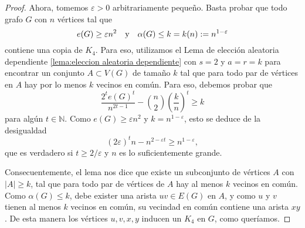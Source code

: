\documentclass[12pt]{report}
\theoremstyle{plain}
\theoremstyle{definition}
\newcommand{\naturals}{\mathbb{N}}
\newcommand{\abs}[1]{\left \vert #1 \right \vert}
\begin{document}
\begin{proof}
Ahora, tomemos $\varepsilon > 0$ arbitrariamente pequeño. Basta probar que todo grafo $G$ con $n$ vértices tal que
\[
    e(G) \geq \varepsilon n^2 \quad \text y \quad \alpha (G) \leq k = k(n) := n^{1- \varepsilon}
\]
contiene una copia de $K_4$. Para eso, utilizamos el Lema de elección aleatoria dependiente \ref{lema:eleccion aleatoria dependiente} con $s = 2$ y $a = r = k$ para encontrar un conjunto $A \subset V(G)$ de tamaño $k$ tal que para todo par de vértices en $A$ hay por lo menos $k$ vecinos en común. Para eso, debemos probar que
\[
    \frac{2^t e(G)^t}{n^{2t-1}} - \binom n 2 \left ( \frac k n \right )^t \geq k
\]
para algún $t \in \naturals$. Como $e(G) \geq \varepsilon n^2$ y $k = n^{1-\varepsilon}$, esto se deduce de la desigualdad
\[
    (2\varepsilon)^t n - n^{2 - \varepsilon t} \geq n^{1-\varepsilon},
\]
que es verdadero si $t \geq 2 / \varepsilon$ y $n$ es lo suficientemente grande.

Consecuentemente, el lema nos dice que existe un subconjunto de vértices $A$ con $\abs A \geq k$, tal que para todo par de vértices de $A$ hay al menos $k$ vecinos en común. Como $\alpha (G) \leq k$, debe exister una arista $uv \in E(G)$ en $A$, y como $u$ y $v$ tienen al menos $k$ vecinos en común, su vecindad en común contiene una arista $xy$. De esta manera los vértices $u,v,x,y$ inducen un $K_4$ en $G$, como queríamos.
\end{proof}
\end{document}
